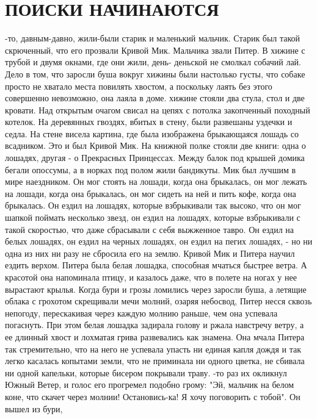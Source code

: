 \chapter{ПОИСКИ НАЧИНАЮТСЯ}
\par{}-то, давным-давно, жили-были старик и маленький мальчик. 
Старик был такой скрюченный, что его прозвали Кривой Мик. Мальчика 
звали Питер. В хижине с трубой и двумя окнами, где они жили, день-
деньской не смолкал собачий лай. Дело в том, что заросли буша вокруг 
хижины были настолько густы, что собаке просто не хватало места 
повилять хвостом, а поскольку лаять без этого совершенно невозможно, 
она лаяла в доме.
 хижине стояли два стула, стол и две кровати. Над открытым очагом 
свисал на цепях с потолка закопченный походный котелок. На деревянных 
гвоздях, вбитых в стену, были развешаны уздечки и седла. На стене 
висела картина, где была изображена брыкающаяся лошадь со всадником. 
Это и был Кривой Мик. На книжной полке стояли две книги: одна о 
лошадях, другая - о Прекрасных Принцессах. Между балок под крышей 
домика бегали опоссумы, а в норках под полом жили бандикуты.
 Мик был лучшим в мире наездником. Он мог стоять на лошади, 
когда она брыкалась, он мог лежать на лошади, когда она брыкалась, он 
мог сидеть на ней и пить кофе, когда она брыкалась. Он ездил на 
лошадях, которые взбрыкивали так высоко, что он мог шапкой поймать 
несколько звезд, он ездил на лошадях, которые взбрыкивали с такой 
скоростью, что даже сбрасывали с себя выжженное тавро. Он ездил на 
белых лошадях, он ездил на черных лошадях, он ездил на пегих лошадях, 
- но ни одна из них ни разу не сбросила его на землю. Кривой Мик и 
Питера научил ездить верхом.
 Питера была белая лошадка, способная мчаться быстрее ветра. А 
красотой она напоминала птицу, и казалось даже, что в полете на ногах 
у нее вырастают крылья. Когда бури и грозы ломились через заросли 
буша, а летящие облака с грохотом скрещивали мечи молний, озаряя 
небосвод, Питер несся сквозь непогоду, перескакивая через каждую 
молнию раньше, чем она успевала погаснуть. При этом белая лошадка 
задирала голову и ржала навстречу ветру, а ее длинный хвост и лохматая 
грива развевались как знамена. Она мчала Питера так стремительно, что 
на него не успевала упасть ни единая капля дождя и так легко касалась 
копытами земли, что не приминала ни одного цветка, не сбивала ни одной 
капельки, которые бисером покрывали траву.
-то раз их окликнул Южный Ветер, и голос его прогремел подобно 
грому: "Эй, мальчик на белом коне, что скачет через молнии! 
Остановись-ка! Я хочу поговорить с тобой". Он вышел из бури, 
